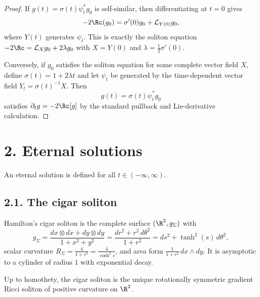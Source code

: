 \begin{proof}
\sketch If \(g(t)=\sigma(t)\psi_t^*g_0\) is self-similar, then differentiating at
\(t=0\) gives
\[
-2\Rc(g_0)=\sigma'(0)g_0+\mathcal L_{Y(0)}g_0,
\]
where \(Y(t)\) generates \(\psi_t\). This is exactly the soliton equation
\(-2\Rc=\mathcal L_X g_0+2\lambda g_0\) with \(X=Y(0)\) and
\(\lambda=\frac12\sigma'(0)\).

Conversely, if \(g_0\) satisfies the soliton equation for some complete vector
field \(X\), define \(\sigma(t)=1+2\lambda t\) and let \(\psi_t\) be generated by
the time-dependent vector field \(Y_t=\sigma(t)^{-1}X\). Then
\[
g(t)=\sigma(t)\psi_t^*g_0
\]
satisfies \(\partial_t g=-2\Rc[g]\) by the standard pullback and Lie-derivative
calculation.
\end{proof}

\section*{2. Eternal solutions}

An eternal solution is defined for all \(t\in(-\infty,\infty)\).

\subsection*{2.1. The cigar soliton}

\begin{example}
\label{ch02-ex-cigar-soliton}

Hamilton's cigar soliton is the complete surface \((\R^2,g_\Sigma)\) with
\[
g_\Sigma=\frac{dx\otimes dx+dy\otimes dy}{1+x^2+y^2}
=\frac{dr^2+r^2\,d\theta^2}{1+r^2}
=ds^2+\tanh^2(s)\,d\theta^2,
\]
scalar curvature \(R_\Sigma=\frac{4}{1+r^2}=\frac{4}{\cosh^2 s}\), and area form
\(\frac{1}{1+r^2}\,dx\wedge dy\). It is asymptotic to a cylinder of radius \(1\)
with exponential decay.
\end{example}

\begin{lemma}
\label{ch02-lem-cigars-unique}

Up to homothety, the cigar soliton is the unique rotationally symmetric
gradient Ricci soliton of positive curvature on \(\R^2\).
\end{lemma}

